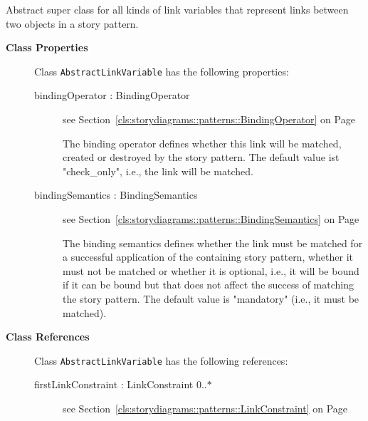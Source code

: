 	
			
Abstract super class for all kinds of link variables that represent links between two objects in a story pattern.	
		
	


\begin{description}

	\item[\textbf{Class Properties}] Class \texttt{AbstractLinkVariable} has the following properties:
	\begin{description}
\item[bindingOperator : BindingOperator 	]
see Section~\ref{cls:storydiagrams::patterns::BindingOperator} on Page~\pageref{cls:storydiagrams::patterns::BindingOperator}
\hspace{\fill}
\nopagebreak


	
			
The binding operator defines whether this link will be matched, created or destroyed by the story pattern. The default value ist "check\_only", i.e., the link will be matched.	
		
	
\item[bindingSemantics : BindingSemantics 	]
see Section~\ref{cls:storydiagrams::patterns::BindingSemantics} on Page~\pageref{cls:storydiagrams::patterns::BindingSemantics}
\hspace{\fill}
\nopagebreak


	
			
The binding semantics defines whether the link must be matched for a successful application of the containing story pattern, whether it must not be matched or whether it is optional, i.e., it will be bound if it can be bound but that does not affect the success of matching the story pattern. The default value is "mandatory" (i.e., it must be matched).	
		
	
	\end{description}
	
	\item[\textbf{Class References}] Class \texttt{AbstractLinkVariable} has the following references:
	\begin{description}
\item[firstLinkConstraint : LinkConstraint 			0..$*$]
see Section~\ref{cls:storydiagrams::patterns::LinkConstraint} on Page~\pageref{cls:storydiagrams::patterns::LinkConstraint}
\hspace{\fill}
\nopagebreak


	

\end{description}
\end{description}
